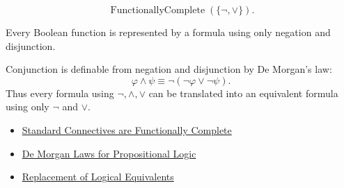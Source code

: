 \begin{remark*}
\[
\operatorname{FunctionallyComplete}(\{\neg,\lor\}).
\]
\end{remark*}

\begin{remark*}
Every Boolean function is represented by a formula using only negation and
disjunction.
\end{remark*}

\begin{remark*}[Interpretation]
Conjunction is definable from negation and disjunction by De Morgan's law:
\[
\varphi\land\psi\equiv\neg(\neg\varphi\lor\neg\psi).
\]
Thus every formula using \(\neg,\land,\lor\) can be translated into an equivalent
formula using only \(\neg\) and \(\lor\).
\end{remark*}

\begin{dependencies}
\begin{itemize}
  \item \hyperref[thm:standard-connectives-functionally-complete-propositional-logic]{Standard Connectives are Functionally Complete}
  \item \hyperref[thm:de-morgan-laws-propositional-logic]{De Morgan Laws for Propositional Logic}
  \item \hyperref[thm:replacement-of-logical-equivalents-propositional-logic]{Replacement of Logical Equivalents}
\end{itemize}
\end{dependencies}
